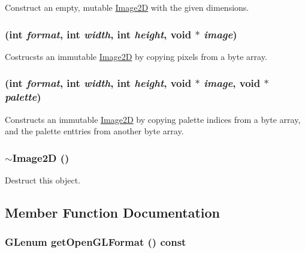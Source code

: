 Construct an empty, mutable \hyperlink{classm3g_1_1Image2D}{Image2D} with the given dimensions. \hypertarget{classm3g_1_1Image2D_8cf9a47f24ed50fe66686c1117fb048c}{
\subsubsection[{Image2D}]{ (int {\em format}, \/  int {\em width}, \/  int {\em height}, \/  void $\ast$ {\em image})}}
\label{classm3g_1_1Image2D_8cf9a47f24ed50fe66686c1117fb048c}


Costrucsts an immutable \hyperlink{classm3g_1_1Image2D}{Image2D} by copying pixels from a byte array. \hypertarget{classm3g_1_1Image2D_f498914ceac20ff9b1708c55ff1484e6}{
\subsubsection[{Image2D}]{ (int {\em format}, \/  int {\em width}, \/  int {\em height}, \/  void $\ast$ {\em image}, \/  void $\ast$ {\em palette})}}
\label{classm3g_1_1Image2D_f498914ceac20ff9b1708c55ff1484e6}


Constructs an immutable \hyperlink{classm3g_1_1Image2D}{Image2D} by copying palette indices from a byte array, and the palette enttries from another byte array. \hypertarget{classm3g_1_1Image2D_7ac703fe7edbb053dd2246ea1bb43200}{
\subsubsection[{$\sim$Image2D}]{\setlength{\rightskip}{0pt plus 5cm}$\sim${\bf Image2D} ()}}
\label{classm3g_1_1Image2D_7ac703fe7edbb053dd2246ea1bb43200}


Destruct this object. 

\subsection{Member Function Documentation}
\hypertarget{classm3g_1_1Image2D_7923da2fe82fee768ec9937a693e843c}{
\subsubsection[{getOpenGLFormat}]{\setlength{\rightskip}{0pt plus 5cm}GLenum getOpenGLFormat () const}}
\label{classm3g_1_1Image2D_7923da2fe82fee768ec9937a693e843c}


